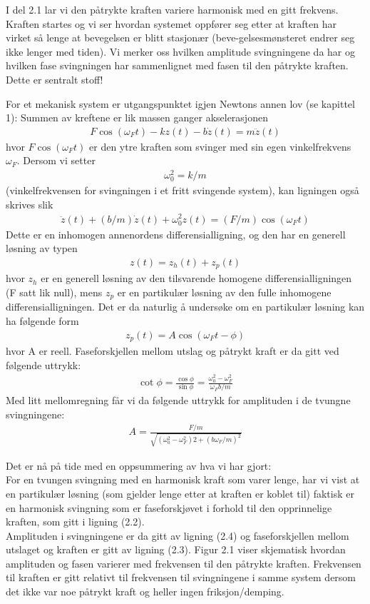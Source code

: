 \documentclass[12pt]{article}
\numberwithin{equation}{section}
\numberwithin{figure}{section}
\newcommand{\equ}[1]{{\small\begin{align*}#1\end{align*}}}
\newcommand{\eq}[1]{{\small\begin{align}#1\end{align}}}
\begin{document}
I del 2.1 lar vi den påtrykte kraften variere harmonisk med en gitt frekvens. Kraften startes og vi ser hvordan systemet oppfører seg etter at kraften har virket så lenge at bevegelsen er blitt stasjonær (beve-gelsesmønsteret endrer seg ikke lenger med tiden). Vi merker oss hvilken amplitude svingningene da har og hvilken fase svingningen har sammenlignet med fasen til den påtrykte kraften. Dette er sentralt stoff!

\begin{tcolorbox}[title = Del 2.1 -- Tvungnge svingninger,breakable]
For et mekanisk system er utgangspunktet igjen Newtons annen lov (se kapittel 1): Summen
av kreftene er lik massen ganger akselerasjonen
\equ{F\cos(\omega_Ft) - k z(t) -b\dot z(t) = m\ddot z(t)}
hvor
$F\cos(\omega_F t)$ er den ytre kraften som svinger med sin egen vinkelfrekvens $\omega_F $. 
Dersom
vi setter
\equ{\omega_0^2 = k/m}
(vinkelfrekvensen for svingningen i et fritt svingende system), kan ligningen også skrives
slik
\eq{\ddot z(t)+(b/m) \dot z(t) + \omega_0^2 z(t)=(F/m) \cos(\omega_F t)}
Dette er en inhomogen annenordens differensialligning, og den har en generell løsning av
typen
\equ{z(t) = z_h(t) + z_p(t)}
hvor $z_h$ er en generell løsning av den tilsvarende homogene differensialligningen 
(F satt lik
null), 
mens $z_p$ er en partikulær løsning av den fulle inhomogene differensialligningen.
\tcbline
Det er da naturlig å undersøke om en partikulær løsning kan ha følgende form
\eq{z_p(t) = A \cos(\omega_F t - \phi)}
hvor A er reell.
\tcbline
Faseforskjellen mellom utslag og påtrykt kraft er da gitt ved følgende uttrykk:
\eq{\cot \phi = \frac{\cos \phi}{\sin \phi} = \frac{\omega_0^2 - \omega_F^2}{\omega_F b/m}}
\tcbline
Med litt mellomregning får vi da følgende uttrykk for amplituden i de tvungne svingningene:
\eq{A = \frac{F/m}{\sqrt{(\omega_0^2 - \omega_F^2 )2 + (b\omega_F /m)^2}}}

Det er nå på tide med en oppsummering av hva vi har gjort:\\

For en tvungen svingning med en harmonisk kraft som varer lenge, har vi vist at en
partikulær løsning (som gjelder lenge etter at kraften er koblet til) 
faktisk er en harmonisk
svingning som er faseforskjøvet i forhold til den opprinnelige kraften, 
som gitt i ligning
(2.2).\\

Amplituden i svingningene er da gitt av ligning (2.4) og faseforskjellen mellom utslaget
og kraften er gitt av ligning (2.3). Figur 2.1 viser skjematisk hvordan amplituden
og fasen varierer med frekvensen til den påtrykte kraften. Frekvensen til kraften er gitt
relativt til frekvensen til svingningene i samme system dersom det ikke var noe påtrykt
kraft og heller ingen friksjon/demping.
\end{tcolorbox}
\end{document}

